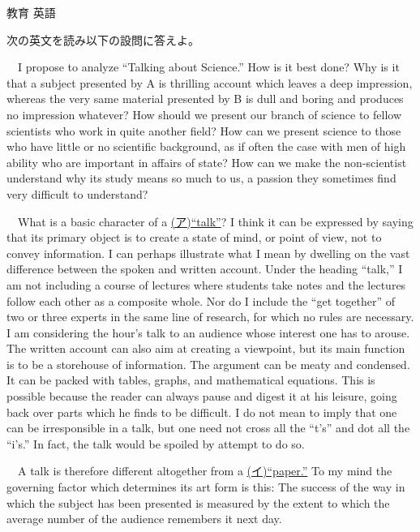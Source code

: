 \documentclass[fleqn]{jbook}
\begin{document}
\begin{question}{教育 英語}{}

\begin{subquestions}
\SubQuestion
次の英文を読み以下の設問に答えよ。
\baselineskip=12pt

　I propose to analyze ``Talking about Science.'' How is it best done? Why is it that a subject presented by A is thrilling account which leaves a deep impression, whereas the very same material presented by B is dull and boring and produces no impression whatever? How should we present our branch of science to fellow scientists who work in quite another field? How can we present science to those who have little or no scientific background, as if often the case with men of high ability who are important in affairs of state? How can we make the non-scientist understand why its study means so much to us, a passion they sometimes find very difficult to understand?

　What is a basic character of a \underline{(ア)``talk''}? I think it can be expressed by saying that its primary object is to create a state of mind, or point of view, not to convey information. I can perhaps illustrate what I mean by dwelling on the vast difference between the spoken and written account. Under the heading ``talk,'' I am not including a course of lectures where students take notes and the lectures follow each other as a composite whole. Nor do I include the ``get together'' of two or three experts in the same line of research, for which no rules are necessary. I am considering the hour's talk to an audience whose interest one has to arouse. The written account can also aim at creating a viewpoint, but its main function is to be a storehouse of information. The argument can be meaty and condensed. It can be packed with tables, graphs, and mathematical equations. This is possible because the reader can always pause and digest it at his leisure, going back over parts which he finds to be difficult. I do not mean to imply that one can be irresponsible in a talk, but one need not cross all the ``t's'' and dot all the ``i's.'' In fact, the talk would be spoiled by attempt to do so.

　A talk is therefore different altogether from a \underline{(イ)``paper.''} To my mind the governing factor which determines its art form is this: The success of the way in which the subject has been presented is measured by the extent to which the average number of the audience remembers it next day.


\end{subquestions}
\end{question}
\end{document}
